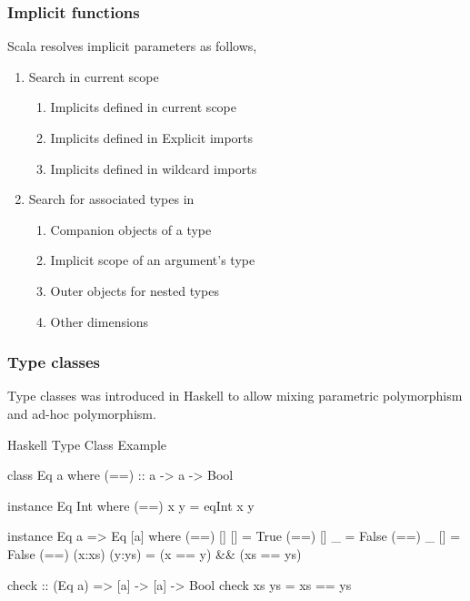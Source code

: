 \documentclass{beamer}
\newcommand{\beb}{\begin{exampleblock}}
\newcommand{\eeb}{\end{exampleblock}}
\begin{document}
\begin{frame}[fragile]
\frametitle{Implicit functions}
Scala resolves implicit parameters as follows,
\begin{enumerate}
\item Search in current scope
  \begin{enumerate}
  \item Implicits defined in current scope
  \item Implicits defined in Explicit imports
  \item Implicits defined in wildcard imports
  \end{enumerate}
\item Search for associated types in
  \begin{enumerate}
  \item Companion objects of a type
  \item Implicit scope of an argument's type 
  \item Outer objects for nested types
  \item Other dimensions
  \end{enumerate}
\end{enumerate}
\end{frame}
\begin{frame}[fragile]
\frametitle{Type classes}

Type classes was introduced in Haskell to allow mixing parametric
polymorphism and ad-hoc polymorphism.
\beb{Haskell Type Class Example}
\begin{code}
class Eq a where 
  (==) :: a -> a -> Bool

instance Eq Int where
  (==) x y = eqInt x y

instance Eq a => Eq [a] where
  (==) [] [] = True
  (==) [] _  = False
  (==) _ []  = False
  (==) (x:xs) (y:ys) = (x == y) && (xs == ys)

check :: (Eq a) => [a] -> [a] -> Bool
check xs ys = xs == ys
\end{code}
\eeb{}

\end{frame}
\end{document}
